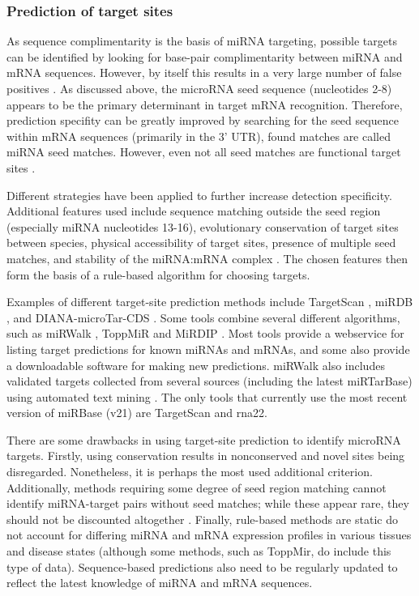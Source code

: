 \subsubsection{Prediction of target sites}

As sequence complimentarity is the basis of miRNA targeting,
possible targets can be identified by looking for base-pair
complimentarity between miRNA and mRNA sequences.
However, by itself this results in a very large number of false
positives \citep{Bartel2009}. As discussed above, the microRNA seed sequence
(nucleotides 2-8) appears to be the primary determinant in target mRNA
recognition. Therefore, prediction specifity can be greatly improved by
searching for the seed sequence within mRNA sequences (primarily in the 3'
UTR), found matches are called miRNA seed matches. However, even
not all seed matches are functional target sites \citep{Grimson2007}.

Different strategies have been applied to further increase detection specificity.
Additional features used include sequence matching outside the seed region
(especially miRNA nucleotides 13-16), evolutionary conservation of target
sites between species, physical accessibility of target sites, presence of
multiple seed matches, and stability of the miRNA:mRNA complex
\citep{Akhtar2016}. The chosen features then form the basis of a rule-based
algorithm for choosing targets.

Examples of different target-site prediction methods include TargetScan
\citep{Agarwal2015}, miRDB \citep{Wong2015}, and DIANA-microTar-CDS
\citep{Paraskevopoulou2013}. Some tools combine several different algorithms,
such as miRWalk \citep{Dweep2015}, ToppMiR \citep{Wu2014} and MiRDIP
\citep{Shirdel2011}. Most tools provide a webservice for listing target
predictions for known miRNAs and mRNAs, and some also provide a downloadable
software for making new predictions.
miRWalk also includes validated targets collected from several sources (including the
latest miRTarBase) using automated text mining . The only
tools that currently use the most recent version of miRBase (v21) are
TargetScan and rna22.

There are some drawbacks in using target-site prediction to identify microRNA
targets. Firstly, using conservation results in nonconserved and novel sites
being disregarded. Nonetheless, it is perhaps the most used additional
criterion. Additionally, methods requiring some degree of seed region matching
cannot identify miRNA-target pairs without seed matches; while these appear
rare, they should not be discounted altogether \citep{Bartel2009}. Finally,
rule-based methods are static do not account for differing miRNA
and mRNA expression profiles in various tissues and disease states (although
some methods, such as ToppMir, do include this type of data). Sequence-based
predictions also need to be regularly updated to reflect the latest knowledge
of miRNA and mRNA sequences.


